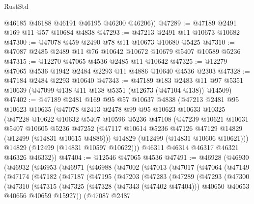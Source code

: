 \begin{lexlean}{RustStd}
\begin{coremodule}
        @46185
        @46188
        @46191
        @46195
        @46200
        @46206))
@47289 := @47189 @2491 @169 @11 @57 @10684 @4838
@47293 := @47213 @2491 @11 @10673 @10682
@47300 := @47078 @459 @2490 @78 @11 @10673 @10680 @5425
@47310 := @47087 @2485 @2489 @11 @76 @10642 @10672 @10679 @5407 @10589 @5236
@47315 := @12270 @47065 @4536 @2485 @11 @10642
@47325 := @12279 @47065 @4536 @1942 @2484 @2293 @11 @4886 @10640 @4536 @2303
@47328 := @47184 @2484 @2293 @10640
@47343 := @47189
    @183
    @2483
    @11
    @97
    @5351
    @10639
    (@47099 @138 @11 @138 @5351 (@12673 (@47104 @138)) @14509)
@47402 := @47189
    @2481
    @169
    @95
    @57
    @10637
    @4838
    (@47213
      @2481
      @95
      @10623
      @10635
      (@47078
        @2413
        @2478
        @99
        @95
        @10623
        @10633
        @10325
        (@47228
          @10622
          @10632
          @5407
          @10596
          @5236
          @47108
          (@47239
            @10621
            @10631
            @5407
            @10605
            @5236
            @47252
            (@47117 @10614 @5236 @47126 @47129 @14829 (@12499 (@14831 @10615 @4886)))
            @14829
            (@12499 (@14831 @10606 @10621)))
          @14829
          (@12499 (@14831 @10597 @10622)))
        @46311
        @46314
        @46317
        @46321
        @46326
        @46332))
@47404 := @12546 @47065 @4536
@47491 := @46928
    (@46930
      (@46932
        (@46953
          (@46971
            (@46988
              (@47002
                (@47013
                  (@47017
                    (@47064
                      (@47149
                        (@47174
                          (@47182
                            (@47187
                              (@47195
                                (@47203
                                  (@47283
                                    (@47289
                                      (@47293
                                        (@47300
                                          (@47310
                                            (@47315
                                              (@47325
                                                (@47328 (@47343 (@47402 @47404)))
                                                @40650
                                                @40653
                                                @40656
                                                @40659
                                                @15927))
                                            (@47087
                                              @2487

\end{coremodule}
\end{lexlean}
